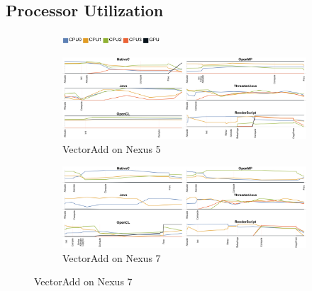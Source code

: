 \subsection{Processor Utilization}


\begin{figure}[ht]
  \centering

  \begin{subfigure}[b]{\textwidth}
          \centering
          \includegraphics[width=0.4\textwidth]{data/load_legend.pdf}
  \end{subfigure}

  \begin{subfigure}[b]{0.9\textwidth}
       \centering
       \includegraphics[width=\textwidth]{data/load_vectoradd_nexus5.pdf}
       \caption{VectorAdd on Nexus 5}\label{fig:Vecadd5}
   \end{subfigure}
  \begin{subfigure}[b]{0.9\textwidth}
       \centering
       \includegraphics[width=\textwidth]{data/load_vectoradd_nexus7.pdf}
       \caption{VectorAdd on Nexus 7}\label{fig:Vecadd7}
   \end{subfigure}


\end{figure}
